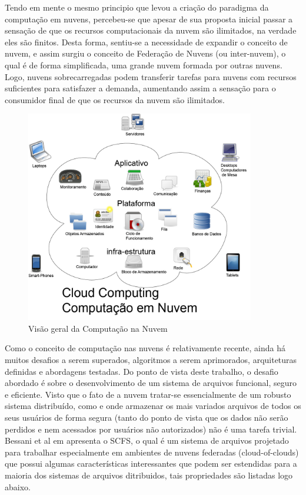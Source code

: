 Tendo em mente o mesmo principio que levou a criação do paradigma da computação em nuvens, percebeu-se que apesar de sua proposta inicial passar a sensação de que os recursos computacionais da nuvem são ilimitados, na verdade eles são finitos. Desta forma, sentiu-se a necessidade de expandir o conceito de nuvem, e assim surgiu o conceito de Federação de Nuvens (ou inter-nuvem), o qual é de forma simplificada, uma grande nuvem formada por outras nuvens. Logo, nuvens sobrecarregadas podem transferir tarefas para nuvens com recursos suficientes para satisfazer a demanda, aumentando assim a sensação para o consumidor final de que os recursos da nuvem são ilimitados. \\

\begin{figure}[htb]
	\begin{center}
		
		\includegraphics[clip,width=10.0cm]{images/image3.jpg}
		\caption{Visão geral da Computação na Nuvem}
		\label{fig:vis_sis}
	\end{center}
\end{figure}

Como o conceito de computação nas nuvens é relativamente recente, ainda há muitos desafios a serem superados, algoritmos a serem aprimorados, arquiteturas definidas e abordagens testadas. Do ponto de vista deste trabalho, o desafio abordado é sobre o desenvolvimento de um sistema de arquivos funcional, seguro e eficiente. Visto que o fato de a nuvem tratar-se essencialmente de um robusto sistema distribuído, como e onde armazenar os mais variados arquivos de todos os seus usuários de forma segura (tanto do ponto de vista que os dados não serão perdidos e nem acessados por usuários não autorizados) não é uma tarefa trivial. Bessani et al em \cite{bessani1} apresenta o SCFS, o qual é um sistema de arquivos projetado para trabalhar especialmente em ambientes de nuvens federadas (cloud-of-clouds) que possui algumas características interessantes que podem ser estendidas para a maioria dos sistemas de arquivos ditribuidos, tais propriedades são listadas logo abaixo. \\

